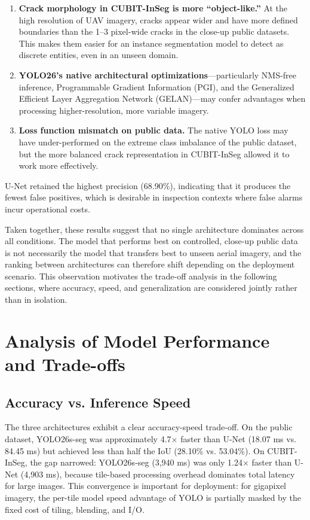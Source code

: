 \begin{enumerate}
	\item \textbf{Crack morphology in CUBIT-InSeg is more ``object-like.''} At the high resolution of UAV imagery, cracks appear wider and have more defined boundaries than the 1--3 pixel-wide cracks in the close-up public datasets. This makes them easier for an instance segmentation model to detect as discrete entities, even in an unseen domain.
	\item \textbf{YOLO26's native architectural optimizations}---particularly NMS-free inference, Programmable Gradient Information (PGI), and the Generalized Efficient Layer Aggregation Network (GELAN)---may confer advantages when processing higher-resolution, more variable imagery.
	\item \textbf{Loss function mismatch on public data.} The native YOLO loss may have under-performed on the extreme class imbalance of the public dataset, but the more balanced crack representation in CUBIT-InSeg allowed it to work more effectively.
\end{enumerate}

\hs U-Net retained the highest precision (68.90\%), indicating that it produces the fewest false positives, which is desirable in inspection contexts where false alarms incur operational costs.

\hs Taken together, these results suggest that no single architecture dominates across all conditions. The model that performs best on controlled, close-up public data is not necessarily the model that transfers best to unseen aerial imagery, and the ranking between architectures can therefore shift depending on the deployment scenario. This observation motivates the trade-off analysis in the following sections, where accuracy, speed, and generalization are considered jointly rather than in isolation.

\section{Analysis of Model Performance and Trade-offs}
\label{sec:analysis_of_model_performance_and_trade-offs}

\subsection{Accuracy vs. Inference Speed}
\label{subsec:accuracy_vs_inference_speed}

\hs The three architectures exhibit a clear accuracy-speed trade-off. On the public dataset, YOLO26s-seg was approximately 4.7$\times$ faster than U-Net (18.07 ms vs. 84.45 ms) but achieved less than half the IoU (28.10\% vs. 53.04\%). On CUBIT-InSeg, the gap narrowed: YOLO26s-seg (3,940 ms) was only 1.24$\times$ faster than U-Net (4,903 ms), because tile-based processing overhead dominates total latency for large images. This convergence is important for deployment: for gigapixel imagery, the per-tile model speed advantage of YOLO is partially masked by the fixed cost of tiling, blending, and I/O.


